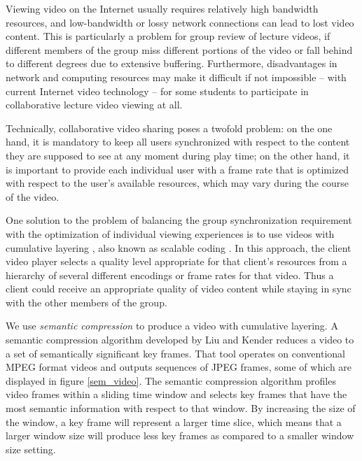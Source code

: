 \documentclass{sig-alternate}
\begin{document}
Viewing video on the Internet usually requires relatively high
bandwidth resources, and low-bandwidth or lossy network connections
can lead to lost video content.  This is particularly a problem for
group review of lecture videos, if different members of the group miss
different portions of the video or fall behind to different degrees
due to extensive buffering.  Furthermore, disadvantages in network and
computing resources may make it difficult if not impossible -- with
current Internet video technology -- for some students to participate
in collaborative lecture video viewing at all.

Technically, collaborative video sharing poses a twofold problem: on
the one hand, it is mandatory to keep all users synchronized with
respect to the content they are supposed to see at any moment during
play time; on the other hand, it is important to provide each
individual user with a frame rate that is optimized with respect to
the user's available resources, which may vary during the course of
the video.

One solution to the problem of balancing the group synchronization
requirement with the optimization of individual viewing experiences is
to use videos with cumulative layering \cite{MCCANNE}, also known as
scalable coding \cite{LI}.  In this approach, the client video player
selects a quality level appropriate for that client's resources from a
hierarchy of several different encodings or frame rates for that
video. Thus a client could receive an appropriate quality of video
content while staying in sync with the other members of the group.



We use {\em semantic compression} to produce a video with cumulative
layering.  A semantic compression algorithm developed by Liu and
Kender \cite{TIECHENG} reduces a video to a set of semantically
significant key frames.  That tool operates on conventional MPEG
format videos and outputs sequences of JPEG frames, some of which are
displayed in figure \ref{sem_video}.  The semantic compression
algorithm profiles video frames within a sliding time window and
selects key frames that have the most semantic information with
respect to that window.  By increasing the size of the window, a key
frame will represent a larger time slice, which means that a larger
window size will produce less key frames as compared to a smaller
window size setting.
\end{document}
